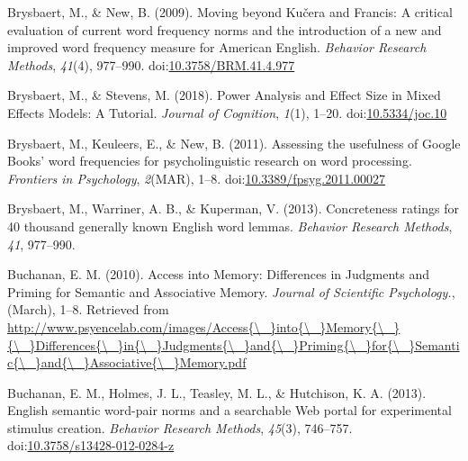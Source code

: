 \documentclass[english,man]{apa6}
\theoremstyle{definition}
\theoremstyle{definition}
\theoremstyle{remark}
\begin{document}
\hypertarget{ref-Brysbaert2009}{}
Brysbaert, M., \& New, B. (2009). Moving beyond Kučera and Francis: A
critical evaluation of current word frequency norms and the introduction
of a new and improved word frequency measure for American English.
\emph{Behavior Research Methods}, \emph{41}(4), 977--990.
doi:\href{https://doi.org/10.3758/BRM.41.4.977}{10.3758/BRM.41.4.977}

\hypertarget{ref-Brysbaert2018}{}
Brysbaert, M., \& Stevens, M. (2018). Power Analysis and Effect Size in
Mixed Effects Models: A Tutorial. \emph{Journal of Cognition},
\emph{1}(1), 1--20.
doi:\href{https://doi.org/10.5334/joc.10}{10.5334/joc.10}

\hypertarget{ref-Brysbaert2011}{}
Brysbaert, M., Keuleers, E., \& New, B. (2011). Assessing the usefulness
of Google Books' word frequencies for psycholinguistic research on word
processing. \emph{Frontiers in Psychology}, \emph{2}(MAR), 1--8.
doi:\href{https://doi.org/10.3389/fpsyg.2011.00027}{10.3389/fpsyg.2011.00027}

\hypertarget{ref-Brysbaert2013}{}
Brysbaert, M., Warriner, A. B., \& Kuperman, V. (2013). Concreteness
ratings for 40 thousand generally known English word lemmas.
\emph{Behavior Research Methods}, \emph{41}, 977--990.

\hypertarget{ref-Buchanan2010}{}
Buchanan, E. M. (2010). Access into Memory: Differences in Judgments and
Priming for Semantic and Associative Memory. \emph{Journal of Scientific
Psychology.}, (March), 1--8. Retrieved from
\href{http://www.psyencelab.com/images/Access\%7B/_\%7Dinto\%7B/_\%7DMemory\%7B/_\%7D\%7B/_\%7DDifferences\%7B/_\%7Din\%7B/_\%7DJudgments\%7B/_\%7Dand\%7B/_\%7DPriming\%7B/_\%7Dfor\%7B/_\%7DSemantic\%7B/_\%7Dand\%7B/_\%7DAssociative\%7B/_\%7DMemory.pdf}{http://www.psyencelab.com/images/Access\{\textbackslash{}\_\}into\{\textbackslash{}\_\}Memory\{\textbackslash{}\_\}\{\textbackslash{}\_\}Differences\{\textbackslash{}\_\}in\{\textbackslash{}\_\}Judgments\{\textbackslash{}\_\}and\{\textbackslash{}\_\}Priming\{\textbackslash{}\_\}for\{\textbackslash{}\_\}Semantic\{\textbackslash{}\_\}and\{\textbackslash{}\_\}Associative\{\textbackslash{}\_\}Memory.pdf}

\hypertarget{ref-Buchanan2013}{}
Buchanan, E. M., Holmes, J. L., Teasley, M. L., \& Hutchison, K. A.
(2013). English semantic word-pair norms and a searchable Web portal for
experimental stimulus creation. \emph{Behavior Research Methods},
\emph{45}(3), 746--757.
doi:\href{https://doi.org/10.3758/s13428-012-0284-z}{10.3758/s13428-012-0284-z}
\end{document}
